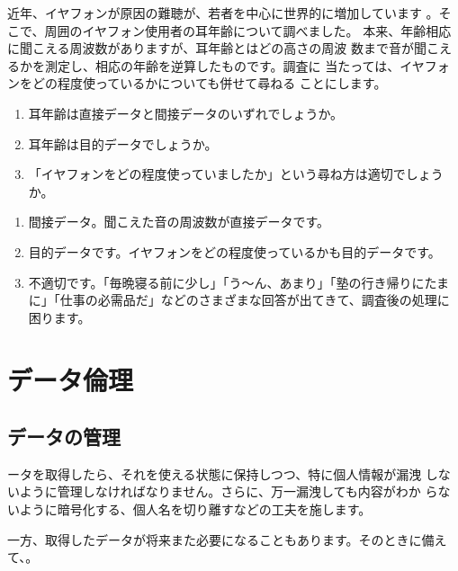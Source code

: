 
\begin{simQ}
近年、イヤフォンが原因の難聴が、若者を中心に世界的に増加しています 。そこで、周囲のイヤフォン使用者の耳年齢について調べました。 本来、年齢相応に聞こえる周波数がありますが、耳年齢とはどの高さの周波 数まで音が聞こえるかを測定し、相応の年齢を逆算したものです。調査に 当たっては、イヤフォンをどの程度使っているかについても併せて尋ねる ことにします。

\begin{enumerate}[label=(\arabic*), itemsep=0pt, parsep=0pt]
    \item 耳年齢は直接データと間接データのいずれでしょうか。 
    \item 耳年齢は目的データでしょうか。 
    \item 「イヤフォンをどの程度使っていましたか」という尋ね方は適切でし\nobreak ょうか。
\end{enumerate}
\end{simQ}
\begin{simA}
    \begin{enumerate}[label=(\arabic*), itemsep=0pt, parsep=0pt]
        \item 間接データ。聞こえた音の周波数が直接データです。
        \item 目的データです。イヤフォンをどの程度使っているかも目的データです。
        \item 不適切です。「毎晩寝る前に少し」「う～ん、あまり」「塾の行き帰りにたまに」「仕事の必需品だ」などのさまざまな回答が出てきて、調査後の処理に困ります。
    \end{enumerate}
\end{simA}

\section{データ倫理}
\subsection{データの管理}
ータを取得したら、それを使える状態に保持しつつ、特に個人情報が漏洩 しないように管理しなければなりません。さらに、万一漏洩しても内容がわか らないように暗号化する、個人名を切り離すなどの工夫を施します。 

一方、取得したデータが将来また必要になることもあります。そのときに備えて、。

